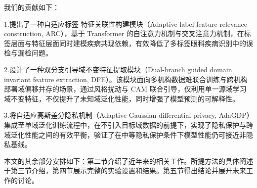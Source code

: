 我们的贡献如下：

\begin{sloppypar}
1.提出了一种自适应标签-特征关联性构建模块（Adaptive label-feature relevance construction, ARC），基于 Transformer 的自注意力机制与交叉注意力机制，在标签层面与特征层面同时建模疾病共现依赖，有效降低了多标签眼科疾病识别中的误检与漏检问题。

2.设计了一种双分支引导域不变特征提取模块（Dual-branch guided domain invariant feature extraction, DFE）。该模块面向多机构数据难联合训练与跨机构部署域偏移并存的场景，通过风格扰动与 CAM 联合引导，仅利用单一源域学习域不变特征，不仅提升了未知域泛化性能，同时增强了模型预测的可解释性。

3.将自适应高斯差分隐私机制（Adaptive Gaussian differential privacy, AdaGDP）集成至单域泛化训练流程中，在不引入目标域数据的前提下，实现了隐私保护与跨域泛化性能之间的有效平衡，验证了在中等隐私保护条件下模型性能仍可接近非隐私基线。
\end{sloppypar}

本文的其余部分安排如下：第二节介绍了近年来的相关工作。所提方法的具体阐述于第三节介绍，第四节展示完整的实验设置和结果。第五节得出结论并展开未来工作的讨论。
